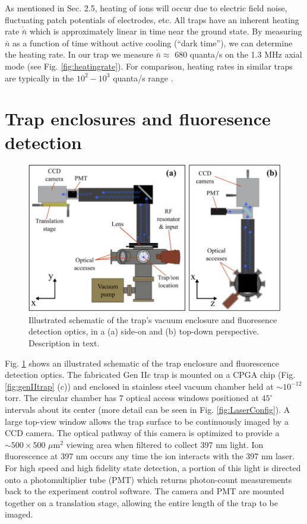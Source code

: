 As mentioned in Sec. 2.5, heating of ions will occur due to electric field noise, fluctuating patch potentials of electrodes, etc. All traps have an inherent heating rate $\dot{\bar{n}}$ which is approximately linear in time near the ground state. By measuring $\bar{n}$ as a function of time without active cooling (``dark time''), we can determine the heating rate. In our trap we measure $\dot{\bar{n}} \approx$ 680 quanta/s on the 1.3 MHz axial mode (see Fig. \ref{fig:heatingrate}). For comparison, heating rates in similar traps are typically in the $10^2 - 10^3$ quanta/s range \cite{doi:10.1063/1.4917385, PhysRevLett.96.253003, PhysRevA.76.033411, Shu14.PRA.89.062308}.

\section{Trap enclosures and fluoresence detection}

\begin{figure}[t]
    \begin{center}
        \includegraphics{figures/3/Fig_CameraConfigPNG}
        \caption{\label{fig:CameraConfig} Illustrated schematic of the trap's vacuum enclosure and fluoresence detection optics, in a (a) side-on and (b) top-down perspective. Description in text.   }
    \end{center}
\end{figure}


Fig. \ref{fig:CameraConfig} shows an illustrated schematic of the trap enclosure and fluorescence detection optics. The fabricated Gen IIc trap is mounted on a CPGA chip (Fig. \ref{fig:genIItrap} (c)) and enclosed in stainless steel vacuum chamber held at $\sim 10^{-12}$ torr. The circular chamber has 7 optical access windows positioned at $45^{\circ}$ intervals about its center (more detail can be seen in Fig. \ref{fig:LaserConfig}). A large top-view window allows the trap surface to be continuously imaged by a CCD camera. The optical pathway of this camera is optimized to provide a $\sim 500 \times 500$ $\mu$m$^2$ viewing area when filtered to collect 397 nm light. Ion fluorescence at 397 nm occurs any time the ion interacts with the 397 nm laser. For high speed and high fidelity state detection, a portion of this light is directed onto a photomultiplier tube (PMT) which returns photon-count measurements back to the experiment control software. The camera and PMT are mounted together on a translation stage, allowing the entire length of the trap to be imaged. 

